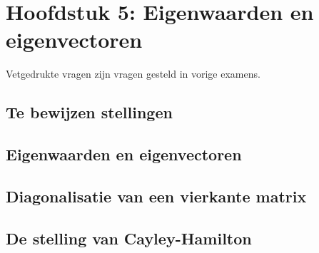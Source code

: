 \documentclass[12pt]{article}
\begin{document}
\date{}    
\maketitle
    \section*{Hoofdstuk 5: Eigenwaarden en eigenvectoren}
    Vetgedrukte vragen zijn vragen gesteld in vorige examens.
    \setcounter{section}{5}
    \subsection*{Te bewijzen stellingen}
    \subsection{Eigenwaarden en eigenvectoren}
    \subsection{Diagonalisatie van een vierkante matrix}
    \subsection{De stelling van Cayley-Hamilton}
\end{document}
